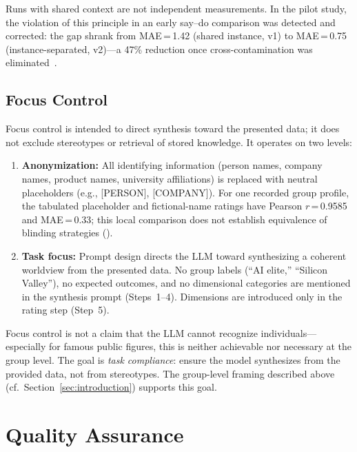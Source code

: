 \documentclass[11pt,a4paper]{article}
\begin{document}
Runs with shared context are not independent measurements. In the pilot study, the violation of this principle in an early say--do comparison was detected and corrected: the gap shrank from MAE\,=\,1.42 (shared instance, v1) to MAE\,=\,0.75 (instance-separated, v2)---a 47\% reduction once cross-contamination was eliminated~\citep{Geiger2026PaperA}.


\subsection{Focus Control}
\label{sec:method:focus}

Focus control is intended to direct synthesis toward the presented data; it does not exclude stereotypes or retrieval of stored knowledge. It operates on two levels:

\begin{enumerate}[nosep]
  \item \textbf{Anonymization:} All identifying information (person names, company names, product names, university affiliations) is replaced with neutral placeholders (e.g., [PERSON], [COMPANY]). For one recorded group profile, the tabulated placeholder and fictional-name ratings have Pearson $r$\,=\,0.9585 and MAE\,=\,0.33; this local comparison does not establish equivalence of blinding strategies (\citealp{Geiger2026PaperA}).
  \item \textbf{Task focus:} Prompt design directs the LLM toward synthesizing a coherent worldview from the presented data. No group labels (``AI elite,'' ``Silicon Valley''), no expected outcomes, and no dimensional categories are mentioned in the synthesis prompt (Steps~1--4). Dimensions are introduced only in the rating step (Step~5).
\end{enumerate}

Focus control is not a claim that the LLM cannot recognize individuals---especially for famous public figures, this is neither achievable nor necessary at the group level. The goal is \emph{task compliance}: ensure the model synthesizes from the provided data, not from stereotypes. The group-level framing described above (cf.\ Section~\ref{sec:introduction}) supports this goal.


\section{Quality Assurance}
\label{sec:qa}
\end{document}
